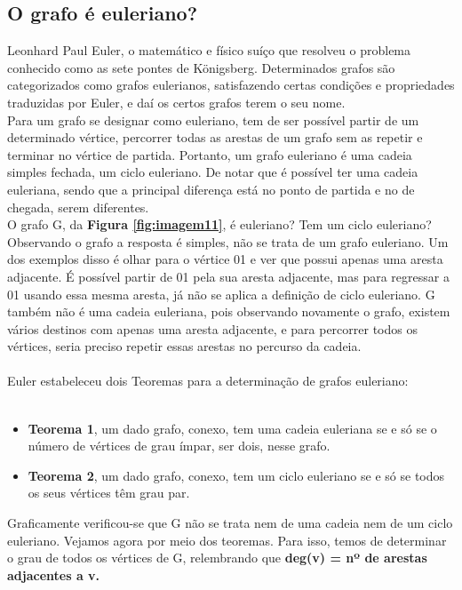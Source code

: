 \subsection{O grafo é euleriano?}
\indent Leonhard Paul Euler, o matemático e físico suíço que resolveu o problema conhecido como as sete pontes de Königsberg. 
Determinados grafos são categorizados como grafos eulerianos, satisfazendo certas condições
e propriedades traduzidas por Euler, e daí os certos grafos terem o seu nome.\\
\indent Para um grafo se designar como euleriano, tem de ser possível partir de um determinado vértice,
percorrer todas as arestas de um grafo sem as repetir e terminar no vértice de partida. Portanto, um grafo 
euleriano é uma cadeia simples fechada, um ciclo euleriano. De notar que é possível ter uma cadeia euleriana, 
sendo que a principal diferença está no ponto de partida e no de chegada, serem diferentes.\\
\indent O grafo G, da \textbf{Figura \ref{fig:imagem11}}, é euleriano? Tem um ciclo euleriano? Observando o grafo a resposta é simples,
não se trata de um grafo euleriano. Um dos exemplos disso é olhar para o vértice 01 e ver que possui apenas 
uma aresta adjacente. É possível partir de 01 pela sua aresta adjacente, mas para regressar a 01 usando essa 
mesma aresta, já não se aplica a definição de ciclo euleriano. G também não é uma cadeia euleriana, pois
observando novamente o grafo, existem vários destinos com apenas uma aresta adjacente, e para percorrer 
todos os vértices, seria preciso repetir essas arestas no percurso da cadeia.\\
\\
\indent Euler estabeleceu dois Teoremas para a determinação de grafos euleriano:\\
\\
\begin{itemize}
\item 
\textbf{Teorema 1}, um dado grafo, conexo, tem uma cadeia euleriana se e só se o número de vértices de grau ímpar, ser dois, nesse grafo.
\item 
\textbf{Teorema 2}, um dado grafo, conexo, tem um ciclo euleriano se e só se todos os seus vértices têm grau par.
\end{itemize}
\indent Graficamente verificou-se que G não se trata nem de uma cadeia nem de um ciclo euleriano. Vejamos 
agora por meio dos teoremas. Para isso, temos de determinar o grau de todos os vértices de G, relembrando 
que \textbf{deg(v) = nº de arestas adjacentes a v.} \\

